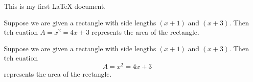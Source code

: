 \documentclass[12pt]{article}
\begin{document}
This is my first LaTeX document.

Suppose we are given a rectangle with side lengths $(x+1)$ and $(x+3)$. Then teh euation $A=x^2=4x+3$ represents the area of the rectangle.

Suppose we are given a rectangle with side lengths $(x+1)$ and $(x+3)$. Then teh euation $$A=x^2=4x+3$$ represents the area of the rectangle.
\end{document}

